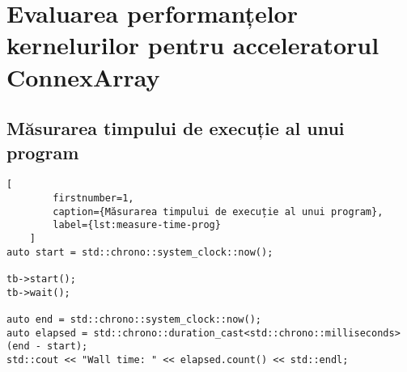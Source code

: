 \chapter{Evaluarea performanțelor kernelurilor pentru acceleratorul ConnexArray}

\section{Măsurarea timpului de execuție al unui program}
\label{sec:measure-time}

\begin{lstlisting}[
        firstnumber=1,
        caption={Măsurarea timpului de execuție al unui program},
        label={lst:measure-time-prog}
    ]
auto start = std::chrono::system_clock::now();

tb->start();
tb->wait();

auto end = std::chrono::system_clock::now();
auto elapsed = std::chrono::duration_cast<std::chrono::milliseconds>(end - start);
std::cout << "Wall time: " << elapsed.count() << std::endl;
\end{lstlisting}


